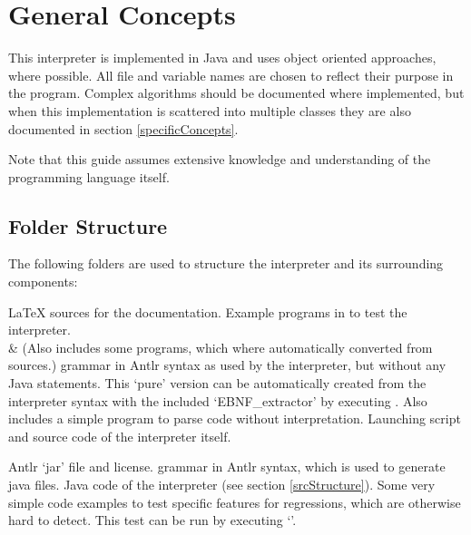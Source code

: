 \section{General Concepts}

This interpreter is implemented in Java and uses object oriented approaches, where possible. All file and variable names are chosen to reflect their purpose in the program. Complex algorithms should be documented where implemented, but when this implementation is scattered into multiple classes they are also documented in section \ref{specificConcepts}.

Note that this guide assumes extensive knowledge and understanding of the \SetlX{} programming language itself.


\subsection{Folder Structure}

The following folders are used to structure the interpreter and its surrounding components:

\begin{itemize}
			{\LaTeX{} sources for the documentation.}
			{Example programs in \SetlX{} to test the interpreter.\\&
			 (Also includes some programs, which where automatically converted from \SetlTwo{} sources.)}
			{\SetlX{} grammar in Antlr syntax as used by the interpreter, but without any Java statements. This `pure' version can be automatically created from the interpreter syntax with the included `EBNF\_extractor' by executing . Also includes a simple program to parse \SetlX{} code without interpretation.}
			{Launching script and source code of the interpreter itself.}
	\begin{itemize}
				{Antlr `jar' file and license.}
				{\SetlX{} grammar in Antlr syntax, which is used to generate java files.}
				{Java code of the interpreter (see section \ref{srcStructure}).}
				{Some very simple \SetlX{} code examples to test specific features for regressions, which are otherwise hard to detect. This test can be run by executing `'.}
	\end{itemize}
\end{itemize}

